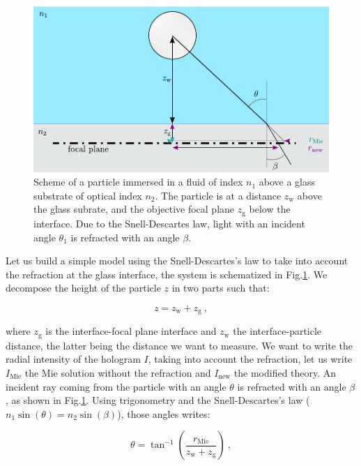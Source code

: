 \begin{figure}[H]
	\centering
	\includegraphics{02_body/chapter4/images/h_measurement/drawing_angles.pdf}
	\caption{Scheme of a particle immersed in a fluid of index $n_1$ above a glass substrate of optical index $n_2$. The particle is at a distance $z_\mathrm{w}$ above the glass subrate, and the objective focal plane $z_\mathrm{g}$ below the interface. Due to the Snell-Descartes law, light with an incident angle $\theta_1$ is refracted with an angle $\beta$. }
	\label{fig.schema_h}
\end{figure}

Let us build a simple model using the Snell-Descartes’s law to take into account the refraction at the glass interface, the system is schematized in Fig.\ref{fig.schema_h}. We decompose the height of the particle $z$ in two parts such that:

\begin{equation}
	z = z_\mathrm{w} + z_\mathrm{g} ~,
\end{equation}

where $z_\mathrm{g}$ is the interface-focal plane interface and $z_\mathrm{w}$ the interface-particle distance, the latter being the distance we want to measure. We want to write the radial intensity of the hologram $I$, taking into account the refraction, let us write  $I_\mathrm{Mie}$ the Mie solution without the refraction and $I_\mathrm{new}$ the modified theory. An incident ray coming from the particle with an angle $\theta$ is refracted with an angle $\beta$, as shown in Fig.\ref{fig.schema_h}. Using trigonometry and the Snell-Descartes's law ($n_1 \sin(\theta)  = n_2 \sin(\beta)$), those angles writes:

\begin{equation}
	\theta = \tan ^{-1} \left( \frac{r_\mathrm{Mie}}{z_\mathrm{w} + z_\mathrm{g}}\right) ~,
\end{equation} 

